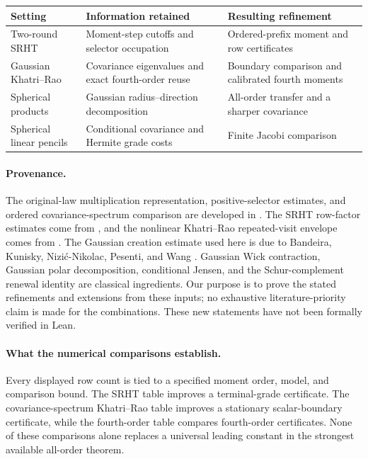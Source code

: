 \documentclass[11pt,a4paper]{article}
\theoremstyle{definition}\newtheorem{definition}[theorem]{Definition}
\theoremstyle{remark}\newtheorem{remark}[theorem]{Remark}
\numberwithin{equation}{section}
\begin{document}
\begin{center}
\small
\begin{tabularx}{\linewidth}{@{}>{\raggedright\arraybackslash}p{.22\linewidth}>{\raggedright\arraybackslash}X >{\raggedright\arraybackslash}X@{}}
\toprule
Setting & Information retained & Resulting refinement\\
\midrule
Two-round SRHT & Moment-step cutoffs and selector occupation & Ordered-prefix moment and row certificates\\
Gaussian Khatri--Rao & Covariance eigenvalues and exact fourth-order reuse & Boundary comparison and calibrated fourth moments\\
Spherical products & Gaussian radius--direction decomposition & All-order transfer and a sharper covariance\\
Spherical linear pencils & Conditional covariance and Hermite grade costs & Finite Jacobi comparison\\
\bottomrule
\end{tabularx}
\end{center}

\paragraph{Provenance.}
The original-law multiplication representation, positive-selector
estimates, and ordered covariance-spectrum comparison are developed in
\cite{GradedSource}. The SRHT row-factor estimates come from
\cite{SRHTSource}, and the nonlinear Khatri--Rao repeated-visit envelope
comes from \cite{KRSource}. The Gaussian creation estimate used here is
due to Bandeira, Kunisky, Nizi\'{c}-Nikolac, Pesenti, and Wang
\cite{Bandeira}. Gaussian Wick contraction, Gaussian polar decomposition,
conditional Jensen, and the Schur-complement renewal identity are
classical ingredients. Our purpose is to prove the stated refinements
and extensions from these inputs; no exhaustive literature-priority
claim is made for the combinations. These new statements have not been
formally verified in Lean.

\paragraph{What the numerical comparisons establish.}
Every displayed row count is tied to a specified moment order, model,
and comparison bound. The SRHT table improves a terminal-grade
certificate. The covariance-spectrum Khatri--Rao table improves a
stationary scalar-boundary certificate, while the fourth-order table
compares fourth-order certificates. None of these comparisons alone
replaces a universal leading constant in the strongest available
all-order theorem.
\end{document}
